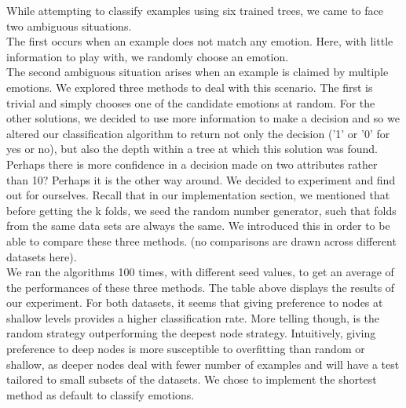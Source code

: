 While attempting to classify examples using six trained trees, we came to face two ambiguous situations.\\
The first occurs when an example does not match any emotion.
Here, with little information to play with, we randomly choose an emotion.\\
The second ambiguous situation arises when an example is claimed by multiple emotions.
We explored three methods to deal with this scenario.
The first is trivial and simply chooses one of the candidate emotions at random.
For the other solutions, we decided to use more information to make a decision and so we altered our classification algorithm
to return not only the decision ('1' or '0' for yes or no), but also the depth within a tree at which this solution was found.
Perhaps there is more confidence in a decision made on two attributes rather than 10? Perhaps it is the other way around.
We decided to experiment and find out for ourselves. Recall that in our implementation section, we mentioned that before getting
the k folds, we seed the random number generator, such that folds from the same data sets are always the same. We introduced this
in order to be able to compare these three methods. (no comparisons are drawn across different datasets here). \\






We ran the algorithms 100 times, with different seed values, to get an average of the performances of these three methods.
The table above displays the results of our experiment.
For both datasets, it seems that giving preference to nodes at shallow levels provides a higher classification rate.
More telling though, is the random strategy outperforming the deepest node strategy.
Intuitively, giving preference to deep nodes is more susceptible to overfitting than random or shallow, as deeper nodes
deal with fewer number of examples and will have a test tailored to small subsets of the datasets.
We chose to implement the shortest method as default to classify emotions.


